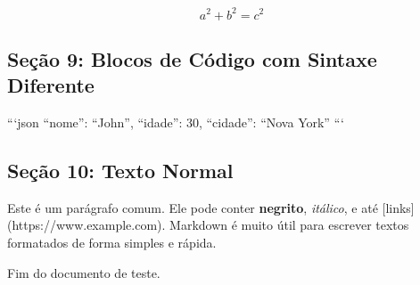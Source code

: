 \[ 
a^2 + b^2 = c^2 
\]

\subsection*{Seção 9: Blocos de Código com Sintaxe Diferente}

```json
{
  ``nome'': ``John'',
  ``idade'': 30,
  ``cidade'': ``Nova York''
}
```

\subsection*{Seção 10: Texto Normal}

Este é um parágrafo comum. Ele pode conter \textbf{negrito}, \textit{itálico}, e até [links](https://www.example.com). Markdown é muito útil para escrever textos formatados de forma simples e rápida.

Fim do documento de teste.
